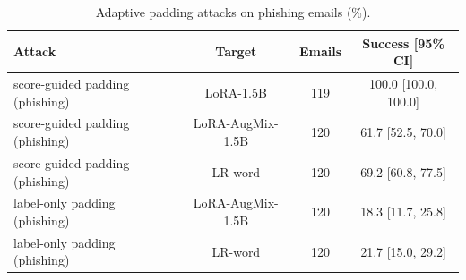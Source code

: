 \begin{table}[t]
\centering
\caption{Adaptive padding attacks on phishing emails (\%).}
\label{tab:phishattacks}
\footnotesize
\begin{tabular}{lccc}
\toprule
\textbf{Attack} & \textbf{Target} & \textbf{Emails} & \textbf{Success [95\% CI]} \\
\midrule
score-guided padding (phishing) & LoRA-1.5B & 119 & 100.0 [100.0, 100.0] \\
score-guided padding (phishing) & LoRA-AugMix-1.5B & 120 & 61.7 [52.5, 70.0] \\
score-guided padding (phishing) & LR-word & 120 & 69.2 [60.8, 77.5] \\
label-only padding (phishing) & LoRA-AugMix-1.5B & 120 & 18.3 [11.7, 25.8] \\
label-only padding (phishing) & LR-word & 120 & 21.7 [15.0, 29.2] \\
\bottomrule
\end{tabular}
\end{table}